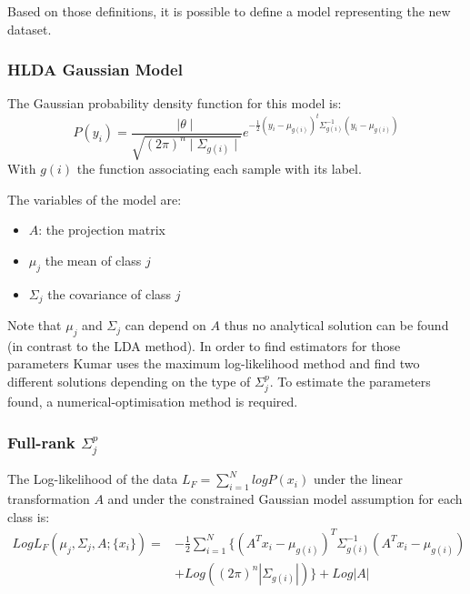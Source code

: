 Based on those definitions, it is possible to define a model representing the new dataset.

\subsubsection{HLDA Gaussian Model}

The Gaussian probability density function for this model is:
$$P(y_i) = \frac{\mid \theta \mid}{\sqrt{(2\pi)^n \mid \Sigma_{g(i)} \mid}}
e^{-\frac{1}{2} (y_i - \mu_{g(i)})^t \Sigma_{g(i)}^{-1} (y_i - \mu_{g(i)})}$$
With $g(i)$ the function associating each sample with its label.

The variables of the model are:
\begin{itemize}
  \item $A$: the projection matrix
  \item $\mu_j$ the mean of class $j$
  \item $\Sigma_j$ the covariance of class $j$
\end{itemize}

Note that $\mu_j$ and $\Sigma_j$ can depend on $A$ thus no analytical solution can be found (in contrast to the LDA method). In order to find estimators for those parameters Kumar\cite{kumar.1997} uses the maximum log-likelihood method and find two different solutions depending on the type of $\Sigma_j^p$.
To estimate the parameters found, a numerical-optimisation method is required.

\subsubsection{Full-rank $\Sigma_j^p$}

The Log-likelihood of the data $L_F = \sum\limits_{i = 1}^N log P(x_i)$ under the linear transformation $A$ and under the constrained Gaussian model assumption for each class is:
$$\begin{array}{cl}
  Log L_F(\mu_j, \Sigma_j, A; \{x_i\}) = & - \frac{1}{2} \sum\limits_{i = 1}^N\{(A^T x_i - \mu_{g(i)})^T\Sigma_{g(i)}^{-1}
  (A^T x_i - \mu_{g(i)}) \\
  & + Log((2\pi)^n|\Sigma_{g(i)}|)\} + Log|A|
\end{array}$$

